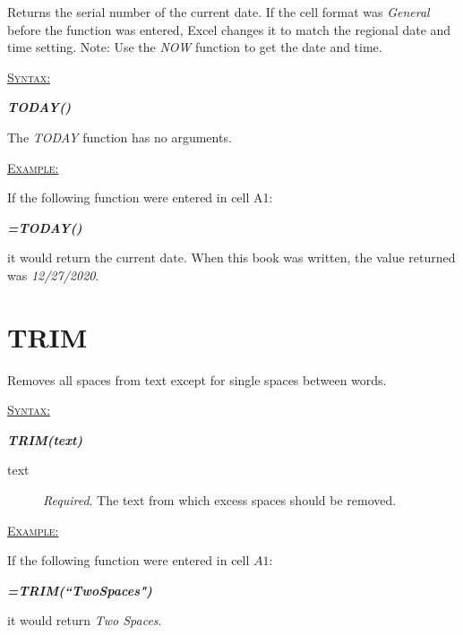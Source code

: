 Returns the serial number of the current date. If the cell format was \textit{General} before the function was entered, Excel changes it to match the regional date and time setting. Note: Use the \textit{NOW} function to get the date and time.

\begin{addmargin}[1cm]{0cm}
	
	\medskip
	\underline{\textsc{Syntax:}}
	\medskip
	
	{\color{Syntax}
		\noindent\textbf{\textit{TODAY()}}
	}
	
	\medskip
	\noindent The \textit{TODAY} function has no arguments.
	
	\medskip
	\noindent\underline{\textsc{Example:}}
	\medskip
	
	\noindent If the following function were entered in cell A1:
	
	{\color{Syntax}
		\textit{\textbf{=TODAY()}}
	}
	
	\noindent it would return the current date. When this book was written, the value returned was \textit{12/27/2020}.
	
	
\end{addmargin}

\section{TRIM}

Removes all spaces from text except for single spaces between words. 

\begin{addmargin}[1cm]{0cm}
	
	\medskip
	\underline{\textsc{Syntax:}}
	\medskip
	
	{\color{Syntax}
		\noindent\textbf{\textit{TRIM(text)}}
	}
	
	\begin{description}
		\item[text] \textit{Required}. The text from which excess spaces should be removed.
	\end{description}

	\medskip
	\noindent\underline{\textsc{Example:}}
	\medskip
	
	\noindent If the following function were entered in cell $ A1 $:
	
	{\color{Syntax}
		\textit{\textbf{=TRIM(``\:\:\:Two\:\:\:\:\:Spaces\:\:\:\:")}}
	}
	
	\noindent it would return \textit{Two Spaces}.

\end{addmargin}

